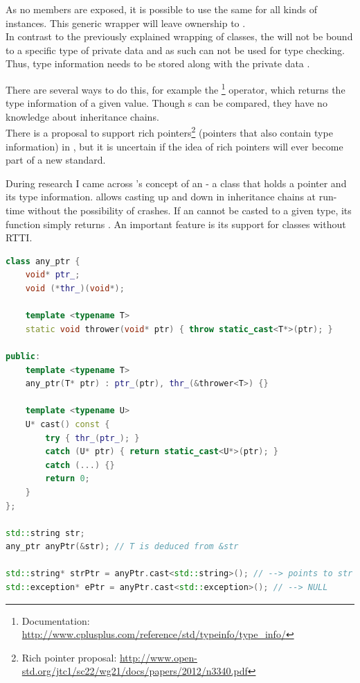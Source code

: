 As no members are exposed, it is possible to use the same  for all kinds of instances. This generic wrapper will leave ownership to .\\
In contrast to the previously explained wrapping of classes, the   will not be bound to a specific type of private data and as such can not be used for type checking. Thus, type information needs to be stored along with the private data .

There are several ways to do this, for example the  \footnote{Documentation: \url{http://www.cplusplus.com/reference/std/typeinfo/type_info/}} operator, which returns the type information of a given value. Though s can be compared, they have no knowledge about inheritance chains.\\
There is a proposal to support rich pointers\footnote{Rich pointer proposal: \url{http://www.open-std.org/jtc1/sc22/wg21/docs/papers/2012/n3340.pdf}} (pointers that also contain type information) in , but it is uncertain if the idea of rich pointers will ever become part of a new  standard.

During research I came across 's concept of an  - a class that holds a pointer and its type information.  allows casting up and down in inheritance chains at run-time without the possibility of crashes. If an  cannot be casted to a given type, its  function simply returns . An important feature is its support for classes without RTTI.

\begin{lstlisting}[language=C++, caption=Implementation of \mySCName{any\_ptr}]
class any_ptr {
    void* ptr_;
    void (*thr_)(void*);
 
    template <typename T>
    static void thrower(void* ptr) { throw static_cast<T*>(ptr); }
 
public:
    template <typename T>
    any_ptr(T* ptr) : ptr_(ptr), thr_(&thrower<T>) {}
 
    template <typename U>
    U* cast() const {
        try { thr_(ptr_); }
        catch (U* ptr) { return static_cast<U*>(ptr); }
        catch (...) {}
        return 0;
    }
};

std::string str;
any_ptr anyPtr(&str); // T is deduced from &str

std::string* strPtr = anyPtr.cast<std::string>(); // --> points to str
std::exception* ePtr = anyPtr.cast<std::exception>(); // --> NULL
\end{lstlisting}
\OnehalfSpacing

